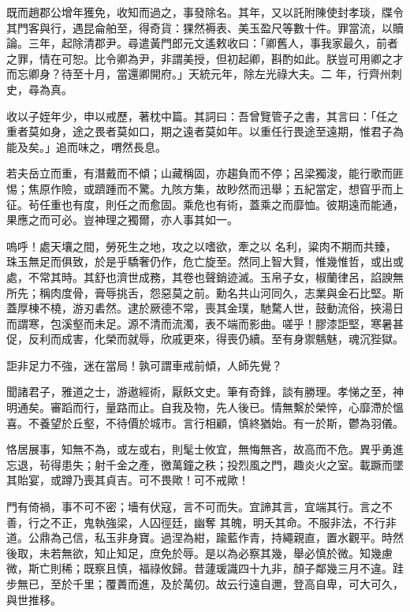\begin{pinyinscope}
 既而趙郡公增年獲免，收知而過之，事發除名。其年，又以託附陳使封孝琰，牒令其門客與行，遇昆侖舶至，得奇貨：猓然褥表、美玉盈尺等數十件。罪當流，以贖論。三年，起除清郡尹。尋遣黃門郎元文遙敕收曰：「卿舊人，事我家最久，前者之罪，情在可恕。比令卿為尹，非謂美授，但初起卿，斟酌如此。朕豈可用卿之才而忘卿身？待至十月，當還卿開府。」天統元年，除左光祿大夫。二
 年，行齊州刺史，尋為真。



 收以子姪年少，申以戒歷，著枕中篇。其詞曰：吾曾覽管子之書，其言曰：「任之重者莫如身，途之畏者莫如口，期之遠者莫如年。以重任行畏途至遠期，惟君子為能及矣。」追而味之，喟然長息。



 若夫岳立而重，有潛戴而不傾；山藏稱固，亦趨負而不停；呂梁獨浚，能行歌而匪惕；焦原作險，或躋踵而不驚。九陔方集，故眇然而迅舉；五紀當定，想窅乎而上征。茍任重也有度，則任之而愈固。乘危也有術，蓋乘之而靡恤。彼期遠而能通，果應之而可必。豈神理之獨爾，亦人事其如一。



 嗚呼！處天壤之間，勞死生之地，攻之以嗜欲，牽之以
 名利，粱肉不期而共臻，珠玉無足而俱致，於是乎驕奢仍作，危亡旋至。然同上智大賢，惟幾惟哲，或出或處，不常其時。其舒也濟世成務，其卷也聲銷迹滅。玉帛子女，椒蘭律呂，諂諛無所先；稱肉度骨，膏辱挑舌，怨惡莫之前。勳名共山河同久，志業與金石比堅。斯蓋厚棟不橈，游刃砉然。逮於厥德不常，喪其金璞，馳騖人世，鼓動流俗，挾湯日而謂寒，包溪壑而未足。源不清而流濁，表不端而影曲。嗟乎！膠漆詎堅，寒暑甚促，反利而成害，化榮而就辱，欣戚更來，得喪仍續。至有身禦魑魅，魂沉狴獄。



 詎非足力不強，迷在當局！孰可謂車戒前傾，人師先覺？



 聞諸君子，雅道之士，游遨經術，厭飫文史。筆有奇鋒，談有勝理。孝悌之至，神明通矣。審蹈而行，量路而止。自我及物，先人後已。情無繫於榮悴，心靡滯於慍喜。不養望於丘壑，不待價於城市。言行相顧，慎終猶始。有一於斯，鬱為羽儀。



 恪居展事，知無不為，或左或右，則髦士攸宜，無悔無吝，故高而不危。異乎勇進忘退，茍得患失；射千金之產，徼萬鐘之秩；投烈風之門，趣炎火之室。載蹶而墜其貽宴，或蹲乃喪其貞吉。可不畏歟！可不戒歟！



 門有倚禍，事不可不密；墻有伏寇，言不可而失。宜諦其言，宜端其行。言之不善，行之不正，鬼執強梁，人囚徑廷，幽奪
 其魄，明夭其命。不服非法，不行非道。公鼎為己信，私玉非身寶。過涅為紺，踰藍作青，持繩親直，置水觀平。時然後取，未若無欲，知止知足，庶免於辱。是以為必察其幾，舉必慎於微。知幾慮微，斯亡則稀；既察且慎，福祿攸歸。昔蘧瑗識四十九非，顏子鄰幾三月不違。跬步無已，至於千里；覆蕢而進，及於萬仞。故云行遠自邇，登高自卑，可大可久，與世推移。




\end{pinyinscope}
